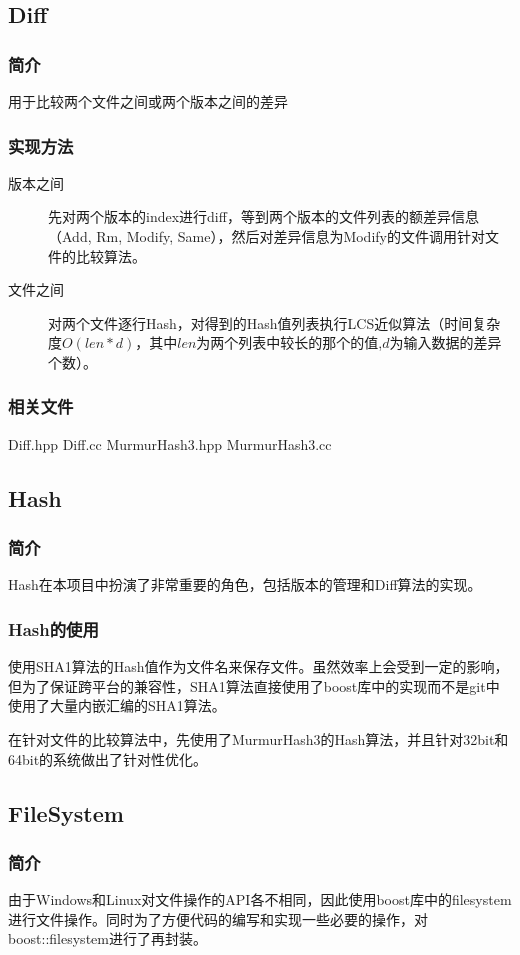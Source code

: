 \documentclass[11pt, a4paper, UTF8]{ctexart}
\begin{document}
\subsection{Diff}
\subsubsection{简介}
用于比较两个文件之间或两个版本之间的差异
\subsubsection{实现方法}
\begin{description}
	\item[版本之间] 先对两个版本的index进行diff，等到两个版本的文件列表的额差异信息（Add, Rm, Modify, Same），然后对差异信息为Modify的文件调用针对文件的比较算法。
	\item[文件之间] 对两个文件逐行Hash，对得到的Hash值列表执行LCS近似算法（时间复杂度$O(len*d)$，其中$len$为两个列表中较长的那个的值,$d$为输入数据的差异个数）。
\end{description}
\subsubsection{相关文件}
Diff.hpp Diff.cc MurmurHash3.hpp MurmurHash3.cc

\subsection{Hash}
\subsubsection{简介}
Hash在本项目中扮演了非常重要的角色，包括版本的管理和Diff算法的实现。
\subsubsection{Hash的使用}
使用SHA1算法的Hash值作为文件名来保存文件。虽然效率上会受到一定的影响，但为了保证跨平台的兼容性，SHA1算法直接使用了boost库中的实现而不是git中使用了大量内嵌汇编的SHA1算法。

在针对文件的比较算法中，先使用了MurmurHash3的Hash算法，并且针对32bit和64bit的系统做出了针对性优化。

\subsection{FileSystem}
\subsubsection{简介}
由于Windows和Linux对文件操作的API各不相同，因此使用boost库中的filesystem进行文件操作。同时为了方便代码的编写和实现一些必要的操作，对boost::filesystem进行了再封装。
\end{document}
